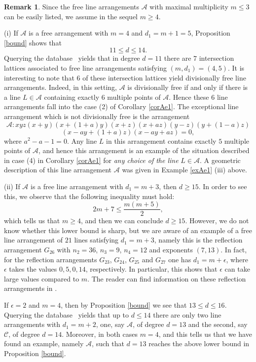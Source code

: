 \documentclass[12pt]{amsart}
\theoremstyle{plain}
\theoremstyle{definition}
\newtheorem{rk}[subsection]{Remark}
\numberwithin{equation}{section}
\newcommand{\A}{{\mathcal A}}
\newcommand{\CC}{{\mathcal C}}
\begin{document}
\begin{rk}
\label{rkE3}
Since the free line arrangements $\A$ with maximal multiplicity $m \leq 3$ can be easily listed, we assume in the sequel $m \geq 4$.

\medskip

\noindent (i) If $\A$ is a free arrangement with $m=4$ and $d_1=m+1=5$, Proposition \ref{bound} shows that
$$11 \leq d \leq 14.$$
Querying the database~\cite{BK} yields that in degree $d=11$ there are $7$ intersection lattices associated to free line arrangements satisfying $(m,d_1)=(4,5)$. It is interesting to note that $6$ of these intersection lattices yield divisionally free line arrangements. Indeed, in this setting,
$\A$ is divisionally free if and only if there is a line $L \in \A$ containing exactly $6$ multiple points of $\A$. Hence these $6$ line arrangements fall into the case (2) of Corollary \ref{corAe1}.
The exceptional line arrangement which is not divisionally free is the arrangement
$$\A:xyz(x+y)(x+(1+a)y)(x+z)(x+az)(y-z)(y+(1-a)z)$$
$$(x-ay+(1+a)z)(x-ay+az)=0,$$
where $a^2-a-1=0$.
Any line $L$ in this arrangement contains exactly $5$ multiple points of $\A$, and hence this arrangement is an example of the situation described in case (4) in Corollary \ref{corAe1} for {\it any choice of the line} $L \in \A$. A geometric description of this line arrangement $\A$ was given in Example \ref{exAe1} (iii) above.
\medskip

\noindent (ii)  If $\mathcal{A}$ is a free line arrangement with $d_{1} = m+3$, then $d\geq 15$. In order to see this, we observe that the following inequality must hold:
$$2m + 7 \leq \frac{m(m+5)}{2},$$
which tells us that $m\geq 4$, and then we can conclude $d\geq 15$. However, we do not know whether this lower bound is sharp, but we are aware of an example of a free line arrangement of $21$ lines satisfying $d_{1}=m+3$, namely this is the reflection arrangement $G_{26}$  with $n_{2} = 36$, $n_{3}=9$, $n_{4}=12$ and exponents $(7,13)$.
In fact, for the reflection arrangements $G_{23}$, $G_{24}$, $G_{25}$ and $G_{27}$ one has $d_1=m+ \epsilon$, where $\epsilon$ takes the values $0, 5, 0,14$, respectively. In particular, this shows that $\epsilon$ can take large values compared to $m$. The reader can find information on these reflection arrangements in \cite[Appendices B and C]{OT}.

\end{rk}

If $\epsilon =2$ and $m=4$, then by Proposition \ref{bound} we see that $13 \leq d\leq 16$.
Querying the database~\cite{BK} yields that up to $d\leq 14$ there are only two line arrangements with $d_{1} = m + 2$, one, say $\A$, of degree $d=13$ and the second, say $\CC$, of degree $d=14$. Moreover, in both cases $m=4$, and this tells us that we have found an example, namely $\A$, such that $d=13$  reaches the above lower bound in Proposition \ref{bound}. 
\end{document}
